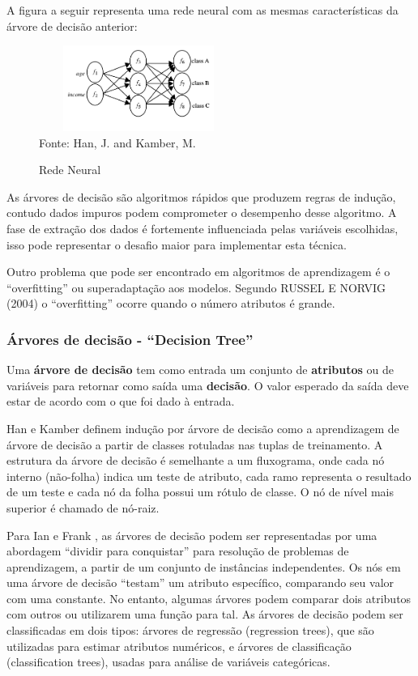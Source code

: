 \documentclass[conference,compsoc]{IEEEtran}
\begin{document}
\pagebreak

A figura a seguir representa uma rede neural com as mesmas características da árvore de decisão anterior:
\begin{figure}[!ht]
\centering
\caption{Rede Neural}
\includegraphics[width=65mm, height=28mm]{Figuras/redeneural.png}\\
\tiny Fonte: Han, J. and Kamber, M. 
\end{figure}  

As árvores de decisão são algoritmos rápidos que produzem regras de indução, contudo dados impuros podem comprometer o desempenho desse algoritmo. 
A fase de extração dos dados é fortemente influenciada pelas variáveis escolhidas, \cite{DecisionTree} 
isso pode representar o desafio maior para implementar esta técnica.

Outro problema que pode ser encontrado em algoritmos de aprendizagem é o ``overfitting'' ou superadaptação aos modelos.
Segundo RUSSEL E NORVIG (2004) o ``overfitting'' ocorre quando o número atributos é grande.

\subsubsection{Árvores de decisão - ``Decision Tree''}

Uma \textbf{árvore de decisão} tem como entrada um conjunto de \textbf{atributos} ou de variáveis para retornar como saída uma \textbf{decisão}.
O valor esperado da saída deve estar de acordo com o que foi dado à entrada.


Han e Kamber \cite{DataMining} definem indução por árvore de decisão como a aprendizagem de árvore de decisão a partir de classes rotuladas nas tuplas de treinamento. 
A estrutura da árvore de decisão é semelhante a um fluxograma, onde cada nó interno (não-folha) indica um teste de atributo, cada ramo representa o resultado de um teste e 
cada nó da folha possui um rótulo de classe. O nó de nível mais superior é chamado de nó-raiz.


Para Ian e Frank \cite{MachineLearning}, as árvores de decisão podem ser representadas por uma abordagem ``dividir para conquistar'' para resolução de problemas de 
aprendizagem, a partir de um conjunto de instâncias independentes. Os nós em uma árvore de decisão ``testam'' um atributo específico, comparando seu valor com uma constante.
No entanto, algumas árvores podem comparar dois atributos com outros ou utilizarem uma função para tal.
As árvores de decisão podem ser classificadas em dois tipos: árvores de regressão (regression trees), que são utilizadas para estimar atributos numéricos, e árvores de 
classificação (classification trees), usadas para análise de variáveis categóricas.
 
\end{document}
